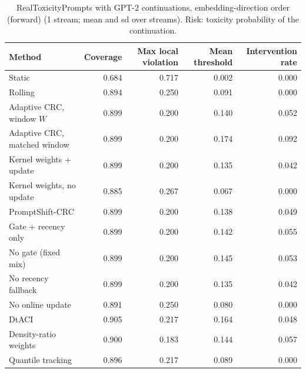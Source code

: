 \begin{table}[H]
\centering
\small
\caption{RealToxicityPrompts with GPT-2 continuations, embedding-direction order (forward) (1 stream; mean and sd over streams). Risk: toxicity probability of the continuation.}
\label{tab:rtp_pc1_forward}
\begin{tabular}{lrrrr}
\toprule
Method & Coverage & Max local violation & Mean threshold & Intervention rate \\
\midrule
Static & 0.684 & 0.717 & 0.002 & 0.000 \\
Rolling & 0.894 & 0.250 & 0.091 & 0.000 \\
Adaptive CRC, window $W$ & 0.899 & 0.200 & 0.140 & 0.052 \\
Adaptive CRC, matched window & 0.899 & 0.200 & 0.174 & 0.092 \\
Kernel weights + update & 0.899 & 0.200 & 0.135 & 0.042 \\
Kernel weights, no update & 0.885 & 0.267 & 0.067 & 0.000 \\
PromptShift-CRC & 0.899 & 0.200 & 0.138 & 0.049 \\
Gate + recency only & 0.899 & 0.200 & 0.142 & 0.055 \\
No gate (fixed mix) & 0.899 & 0.200 & 0.145 & 0.053 \\
No recency fallback & 0.899 & 0.200 & 0.135 & 0.042 \\
No online update & 0.891 & 0.250 & 0.080 & 0.000 \\
DtACI & 0.905 & 0.217 & 0.164 & 0.048 \\
Density-ratio weights & 0.900 & 0.183 & 0.144 & 0.057 \\
Quantile tracking & 0.896 & 0.217 & 0.089 & 0.000 \\
\bottomrule
\end{tabular}
\end{table}

